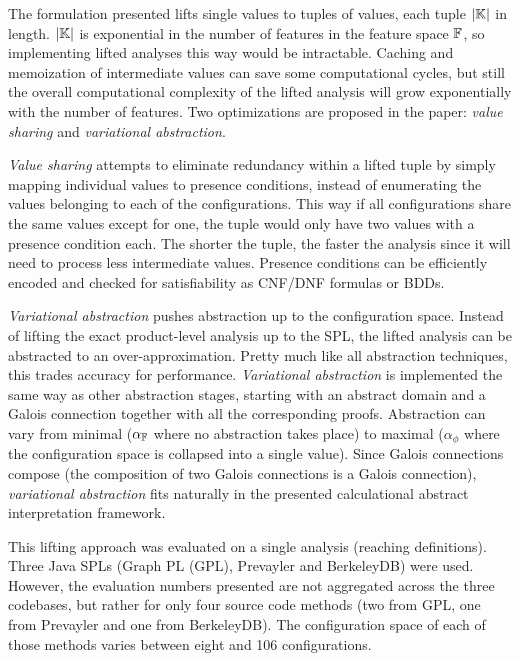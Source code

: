 \documentclass[11pt]{article}
\newcommand{\term}[1] {\emph{#1}}
\begin{document}
The formulation presented lifts single values to tuples of values, each tuple $|\mathbb{K}|$ in length. $|\mathbb{K}|$ is exponential in the number of features in the feature space $\mathbb{F}$, so implementing lifted analyses this way would be intractable. Caching and memoization of intermediate values can save some computational cycles, but still the overall computational complexity of the lifted analysis will grow exponentially with the number of features. Two optimizations are proposed in the paper: \term{value sharing} and \term{variational abstraction}.

\term{Value sharing} attempts to eliminate redundancy within a lifted tuple by simply mapping individual values to presence conditions, instead of enumerating the values belonging to each of the configurations. This way if all configurations share the same values except for one, the tuple would only have two values with a presence condition each. The shorter the tuple, the faster the analysis since it will need to process less intermediate values. Presence conditions can be efficiently encoded and checked for satisfiability as CNF/DNF formulas or BDDs.

\term{Variational abstraction} pushes abstraction up to the configuration space. Instead of lifting the exact product-level analysis up to the SPL, the lifted analysis can be abstracted to an over-approximation. Pretty much like all abstraction techniques, this trades accuracy for performance. \term{Variational abstraction} is implemented the same way as other abstraction stages, starting with an abstract domain and a Galois connection together with all the corresponding proofs. Abstraction can vary from minimal ($\alpha_{\mathbb{F}}$ where no abstraction takes place) to maximal ($\alpha_\phi$ where the configuration space is collapsed into a single value). Since Galois connections compose (the composition of two Galois connections is a Galois connection), \term{variational abstraction} fits naturally in the presented calculational abstract interpretation framework.

This lifting approach was evaluated on a single analysis (reaching definitions). Three Java SPLs (Graph PL (GPL), Prevayler and BerkeleyDB) were used. However, the evaluation numbers presented are not aggregated across the three codebases, but rather for only four source code methods (two from GPL, one from Prevayler and one from BerkeleyDB). The configuration space of each of those methods varies between eight and 106 configurations.
\end{document}
